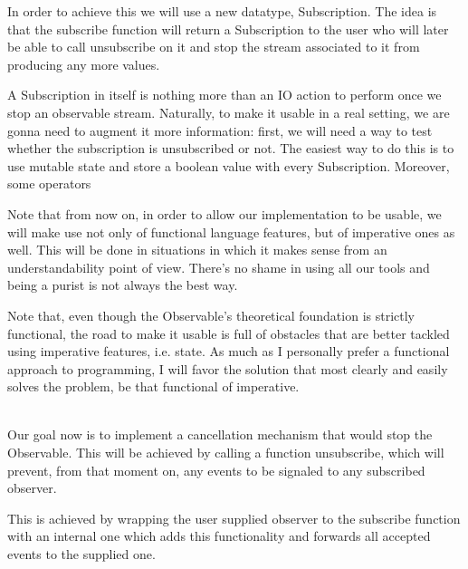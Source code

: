 In order to achieve this we will use a new datatype, Subscription. The idea is that the subscribe function will return a Subscription to the user who will later be able to call unsubscribe on it and stop the stream associated to it from producing any more values.


A Subscription in itself is nothing more than an IO action to perform once we stop an observable stream. Naturally, to make it usable in a real setting, we are gonna need to augment it more information: first, we will need a way to test whether the subscription is unsubscribed or not. The easiest way to do this is to use mutable state and store a boolean value with every Subscription. Moreover, some operators 

Note that from now on, in order to allow our implementation to be usable, we will make use not only of functional language features, but of imperative ones as well. This will be done in situations in which it makes sense from an understandability point of view. There's no shame in using all our tools and being a purist is not always the best way.

Note that, even though the Observable's theoretical foundation is strictly functional, the road to make it usable is full of obstacles that are better tackled using imperative features, i.e. state. As much as I personally prefer a functional approach to programming, I will favor the solution that most clearly and easily solves the problem, be that functional of imperative.

\\

Our goal now is to implement a cancellation mechanism that would stop the Observable. This will be achieved by calling a function unsubscribe, which will prevent, from that moment on, any events to be signaled to any subscribed observer.

This is achieved by wrapping the user supplied observer to the subscribe function with an internal one which adds this functionality and forwards all accepted events to the supplied one.

\\


